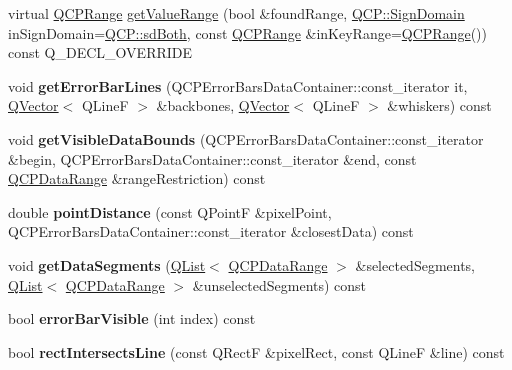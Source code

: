 \begin{DoxyCompactItemize}
\item 
virtual \hyperlink{class_q_c_p_range}{Q\+C\+P\+Range} \hyperlink{class_q_c_p_error_bars_a9fc99406c0fb5b39ce6dced1a8d8ba05}{get\+Value\+Range} (bool \&found\+Range, \hyperlink{namespace_q_c_p_afd50e7cf431af385614987d8553ff8a9}{Q\+C\+P\+::\+Sign\+Domain} in\+Sign\+Domain=\hyperlink{namespace_q_c_p_afd50e7cf431af385614987d8553ff8a9a3dee7e9cd2fedce9253b83e172626a6c}{Q\+C\+P\+::sd\+Both}, const \hyperlink{class_q_c_p_range}{Q\+C\+P\+Range} \&in\+Key\+Range=\hyperlink{class_q_c_p_range}{Q\+C\+P\+Range}()) const Q\+\_\+\+D\+E\+C\+L\+\_\+\+O\+V\+E\+R\+R\+I\+DE
\item 
\mbox{\label{class_q_c_p_error_bars_abeea5ff0d66732bbfc9b74869d8c552e}} 
void {\bfseries get\+Error\+Bar\+Lines} (Q\+C\+P\+Error\+Bars\+Data\+Container\+::const\+\_\+iterator it, \hyperlink{class_q_vector}{Q\+Vector}$<$ Q\+LineF $>$ \&backbones, \hyperlink{class_q_vector}{Q\+Vector}$<$ Q\+LineF $>$ \&whiskers) const
\item 
\mbox{\label{class_q_c_p_error_bars_aac9ffa98815035d300b2e9a67495ba4c}} 
void {\bfseries get\+Visible\+Data\+Bounds} (Q\+C\+P\+Error\+Bars\+Data\+Container\+::const\+\_\+iterator \&begin, Q\+C\+P\+Error\+Bars\+Data\+Container\+::const\+\_\+iterator \&end, const \hyperlink{class_q_c_p_data_range}{Q\+C\+P\+Data\+Range} \&range\+Restriction) const
\item 
\mbox{\label{class_q_c_p_error_bars_a8e904076bad643f43af28b95f21c1b88}} 
double {\bfseries point\+Distance} (const Q\+PointF \&pixel\+Point, Q\+C\+P\+Error\+Bars\+Data\+Container\+::const\+\_\+iterator \&closest\+Data) const
\item 
\mbox{\label{class_q_c_p_error_bars_a243e0bb2563fc2e9f08efd77e7175abf}} 
void {\bfseries get\+Data\+Segments} (\hyperlink{class_q_list}{Q\+List}$<$ \hyperlink{class_q_c_p_data_range}{Q\+C\+P\+Data\+Range} $>$ \&selected\+Segments, \hyperlink{class_q_list}{Q\+List}$<$ \hyperlink{class_q_c_p_data_range}{Q\+C\+P\+Data\+Range} $>$ \&unselected\+Segments) const
\item 
\mbox{\label{class_q_c_p_error_bars_a5ad9abccb1be3df25485ad7dc21b3b89}} 
bool {\bfseries error\+Bar\+Visible} (int index) const
\item 
\mbox{\label{class_q_c_p_error_bars_aa9b1642567a0aff8a2f6e0556c563633}} 
bool {\bfseries rect\+Intersects\+Line} (const Q\+RectF \&pixel\+Rect, const Q\+LineF \&line) const
\end{DoxyCompactItemize}
